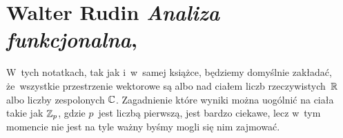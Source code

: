 \documentclass[a4paper,11pt]{article}
\numberwithin{equation}{section}
\begin{document}
\VerSpaceSix












\section{Walter Rudin \textit{Analiza funkcjonalna},
  \parencite{Rudin-Analiza-funkcjonalna-Pub-2012}}





\noindent
W~tych notatkach, tak jak i~w~samej książce, będziemy domyślnie
zakładać, że~wszystkie przestrzenie wektorowe są albo nad ciałem liczb
rzeczywistych~$\mathbb{R}$ albo liczby zespolonych $\mathbb{C}$. Zagadnienie które
wyniki można uogólnić na ciała takie jak $\mathbb{Z}_{ p }$, gdzie $p$~jest liczbą
pierwszą, jest bardzo ciekawe, lecz w~tym momencie nie jest na tyle ważny
byśmy mogli się nim zajmować.

\VerSpaceFour







\noindent
{}

\VerSpaceFour





\noindent
{}

\VerSpaceFour





\noindent
{}

\VerSpaceFour





\noindent
{}

\VerSpaceFour





\noindent
\Str{}

\VerSpaceFour





\noindent
\Str{}

\VerSpaceFour
\end{document}
